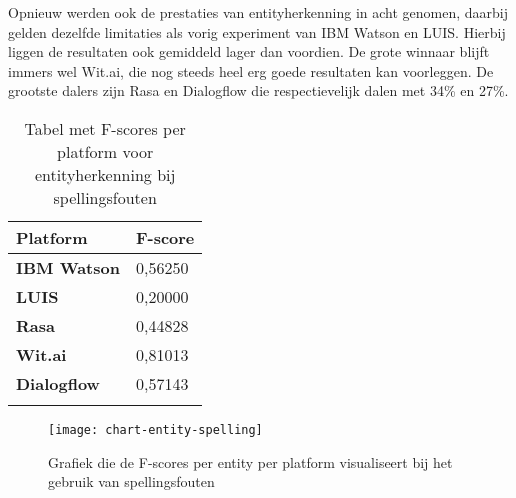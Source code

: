 Opnieuw werden ook de prestaties van entityherkenning in acht genomen, daarbij gelden dezelfde limitaties als vorig experiment van IBM Watson en LUIS. Hierbij liggen de resultaten ook gemiddeld lager dan voordien. De grote winnaar blijft immers wel Wit.ai, die nog steeds heel erg goede resultaten kan voorleggen. De grootste dalers zijn Rasa en Dialogflow die respectievelijk dalen met 34\% en 27\%.

\begin{center}
    \begin{longtable}{| l | l |}
        \hline
        \textbf{Platform} & \textbf{F-score} \\ \hline
        \textbf{IBM Watson} & 0,56250 \\ \hline  
        \textbf{LUIS} & 0,20000 \\ \hline  
        \textbf{Rasa} & 0,44828 \\ \hline  
        \textbf{Wit.ai} & 0,81013  \\ \hline  
        \textbf{Dialogflow} & 0,57143 \\ \hline  
        \caption{Tabel met F-scores per platform voor entityherkenning bij spellingsfouten}                                    
    \end{longtable}
    \label{tbl:results-entity-spelling}
\end{center}

\begin{figure}[H]
    \label{fig:chart-entity-spelling}
    \centering
    \texttt{[image: chart-entity-spelling]}
    \caption{Grafiek die de F-scores per entity per platform visualiseert bij het gebruik van spellingsfouten}
\end{figure}














